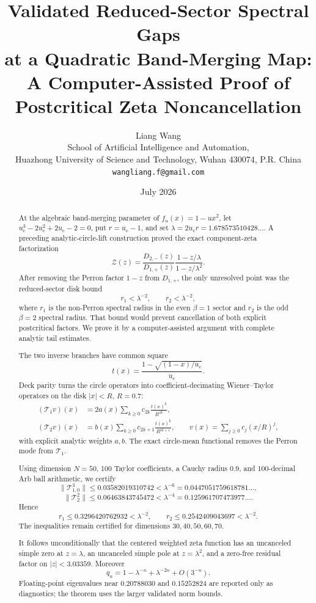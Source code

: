 \documentclass[11pt]{article}
\title{\textbf{Validated Reduced-Sector Spectral Gaps}\\
\textbf{at a Quadratic Band-Merging Map:}\\
\large A Computer-Assisted Proof of Postcritical Zeta Noncancellation}
\author{Liang Wang\\
\small School of Artificial Intelligence and Automation,\\[-0.2em]
\small Huazhong University of Science and Technology, Wuhan 430074, P.R. China\\
\small \texttt{wangliang.f@gmail.com}}
\date{July 2026}
\theoremstyle{definition}
\theoremstyle{remark}
\newcommand{\uc}{u_{\mathrm c}}
\newcommand{\cT}{\mathcal T}
\newcommand{\cZ}{\mathcal Z}
\begin{document}
\maketitle

\begin{abstract}
At the algebraic band-merging parameter of $f_u(x)=1-u x^2$, let
$\uc^3-2\uc^2+2\uc-2=0$, put $r=\uc-1$, and set
$\lambda=2\uc r=1.678573510428\ldots$.  A preceding analytic-circle-lift
construction proved the exact component-zeta factorization
\[
 \cZ(z)=\frac{D_{2,-}(z)}{D_{1,+}(z)}
 \frac{1-z/\lambda}{1-z/\lambda^2}.
\]
After removing the Perron factor $1-z$ from $D_{1,+}$, the only unresolved
point was the reduced-sector disk bound
\[
 r_1<\lambda^{-2},\qquad r_2<\lambda^{-2},
\]
where $r_1$ is the non-Perron spectral radius in the even $\beta=1$ sector and
$r_2$ is the odd $\beta=2$ spectral radius.  That bound would prevent
cancellation of both explicit postcritical factors.  We prove it by a
computer-assisted argument with complete analytic tail estimates.

The two inverse branches have common square
\[
 t(x)=\frac{1-\sqrt{(1-x)/\uc}}{\uc}.
\]
Deck parity turns the circle operators into coefficient-decimating
Wiener--Taylor operators on the disk $|x|<R$, $R=0.7$:
\begin{align*}
 (\cT_1v)(x)&=2a(x)\sum_{k\ge0}c_{2k}\frac{t(x)^k}{R^{2k}},\\
 (\cT_2v)(x)&=b(x)\sum_{k\ge0}c_{2k+1}\frac{t(x)^k}{R^{2k+1}},
 \qquad v(x)=\sum_{j\ge0}c_j(x/R)^j,
\end{align*}
with explicit analytic weights $a,b$.  The exact circle-mean functional
removes the Perron mode from $\cT_1$.

Using dimension $N=50$, 100 Taylor coefficients, a Cauchy radius $0.9$, and
100-decimal Arb ball arithmetic, we certify
\[
 \|\cT_{1,0}^3\|\le0.03582019310742
 <\lambda^{-6}=0.0447051759618781\ldots,
\]
\[
 \|\cT_{2}^2\|\le0.06463843745472
 <\lambda^{-4}=0.125961707473977\ldots.
\]
Hence
\[
 r_1\le0.3296420762932<\lambda^{-2},
 \qquad
 r_2\le0.2542409043697<\lambda^{-2}.
\]
The inequalities remain certified for dimensions $30,40,50,60,70$.

It follows unconditionally that the centered weighted zeta function has an
uncanceled simple zero at $z=\lambda$, an uncanceled simple pole at
$z=\lambda^2$, and a zero-free residual factor on $|z|<3.03359$.  Moreover
\[
 q_n=1-\lambda^{-n}+\lambda^{-2n}+O(3^{-n}).
\]
Floating-point eigenvalues near $0.20788030$ and $0.15252824$ are reported
only as diagnostics; the theorem uses the larger validated norm bounds.
\end{abstract}
\end{document}
